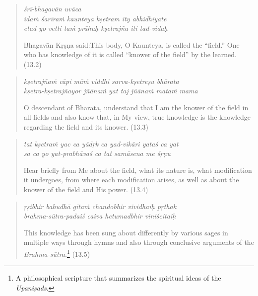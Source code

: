 \documentclass[12pt, twoside, openright]{memoir}
\begin{document}
\par
\begin{verse}
\textit{śrī-bhagavān uvāca} \\
\textit{idaṁ śarīraṁ kaunteya kṣetram ity abhidhīyate} \\
\textit{etad yo vetti taṁ prāhuḥ kṣetrajña iti tad-vidaḥ}

\noindent \quad Bhagavān Kṛṣṇa said:\linebreak This body, O Kaunteya, is called the \enquote{field.} One who has knowledge of it is called \enquote{knower of the field} by the learned. (13.2)
\end{verse}
\par



\par
\begin{verse}
\textit{kṣetrajñaṁ cāpi māṁ viddhi sarva-kṣetreṣu bhārata} \\
\textit{kṣetra-kṣetrajñayor jñānaṁ yat taj jñānaṁ mataṁ mama}

\noindent O descendant of Bharata, understand that I am the knower of the field in all fields and also know that, in My view, true knowledge is the knowledge regarding the field and its knower. (13.3)
\end{verse}
\par



\par
\begin{verse}
\textit{tat kṣetraṁ yac ca yādṛk ca yad-vikāri yataś ca yat} \\
\textit{sa ca yo yat-prabhāvaś ca tat samāsena me śṛṇu}

\noindent Hear briefly from Me about the field, what its nature is, what modification it undergoes, from where each modification arises, as well as about the knower of the field and His power. (13.4)
\end{verse}
\par



\par
\begin{verse}
\textit{ṛṣibhir bahudhā gītaṁ chandobhir vividhaiḥ pṛthak} \\
\textit{brahma-sūtra-padaiś caiva hetumadbhir viniścitaiḥ}

\noindent This knowledge has been sung about differently by various sages in multiple ways through hymns and also through conclusive arguments of the \textit{Brahma-sūtra}.\footnote{A philosophical scripture that summarizes the spiritual ideas of the \textit{Upaniṣads}.} (13.5)
\end{verse}
\par
\end{document}
